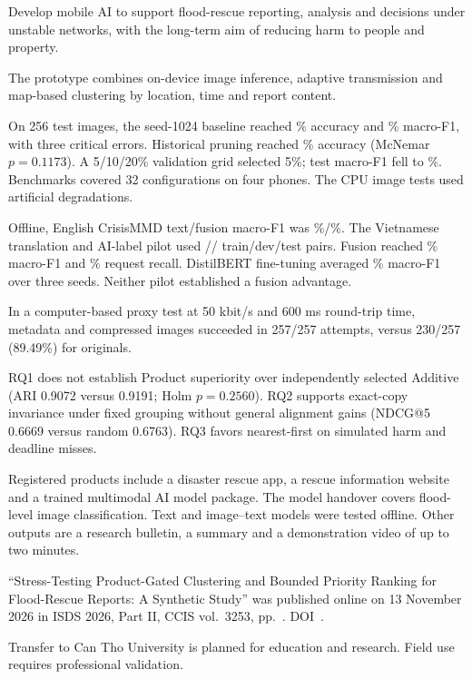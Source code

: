 
Develop mobile AI to support flood-rescue reporting, analysis and decisions under unstable networks, with the long-term aim of reducing harm to people and property.

The prototype combines on-device image inference, adaptive transmission and map-based clustering by location, time and report content.

On 256 test images, the seed-1024 baseline reached \NewImageAccuracy{}\% accuracy and \NewImageMacroFOne{}\% macro-F1, with three critical errors. Historical pruning reached \PruningAccuracy{}\% accuracy (McNemar \(p=0.1173\)). A 5/10/20\% validation grid selected 5\%; test macro-F1 fell to \LocalPrunedFOne{}\%. Benchmarks covered 32 configurations on four phones. The CPU image tests used artificial degradations.

Offline, English CrisisMMD text/fusion macro-F1 was \MMTextFOne{}\%/\MMFusionFOne{}\%. The Vietnamese translation and AI-label pilot used \VISilverTrainN/\VISilverDevN/\VISilverTestN{} train/dev/test pairs. Fusion reached \VISilverFusionFOne{}\% macro-F1 and \VISilverFusionRecall{}\% request recall. DistilBERT fine-tuning averaged \VISilverFineFOne{}\% macro-F1 over three seeds. Neither pilot established a fusion advantage.

\begin{samepage}
In a computer-based proxy test at 50 kbit/s and 600 ms round-trip time, metadata and compressed images succeeded in 257/257 attempts, versus 230/257 (89.49\%) for originals.\par
\end{samepage}

RQ1 does not establish Product superiority over independently selected Additive (ARI 0.9072 versus 0.9191; Holm \(p=0.2560\)). RQ2 supports exact-copy invariance under fixed grouping without general alignment gains (NDCG@5 0.6669 versus random 0.6763). RQ3 favors nearest-first on simulated harm and deadline misses.

Registered products include a disaster rescue app, a rescue information website and a trained multimodal AI model package. The model handover covers flood-level image classification. Text and image--text models were tested offline. Other outputs are a research bulletin, a summary and a demonstration video of up to two minutes.

``Stress-Testing Product-Gated Clustering and Bounded Priority Ranking for Flood-Rescue Reports: A Synthetic Study'' was published online on 13 November 2026 in ISDS 2026, Part II, CCIS vol.~3253, pp.~\ProjectPublicationPages. DOI~\ProjectPublicationDOI.

Transfer to Can Tho University is planned for education and research. Field use requires professional validation.
